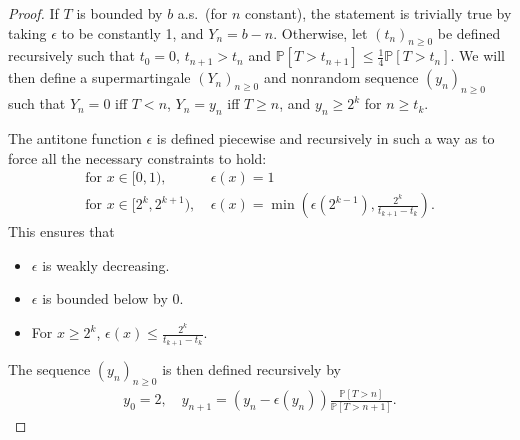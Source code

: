 \antitoneSeemsComplete*

\begin{proof}
If $T$ is bounded by $b$ a.s.~(for $n$ constant), the statement is trivially true by taking $\epsilon$ to be constantly 1, and $Y_n = b - n$.
Otherwise, let $(t_n)_{n \geq 0}$ be defined recursively such that $t_0 = 0$, $t_{n+1} > t_n$ and $\mathbb P[T > t_{n+1}] \leq \frac 1 4 \mathbb P[T > t_n]$.
We will then define a supermartingale $(Y_n)_{n \geq 0}$ and nonrandom sequence $(y_n)_{n \geq 0}$ such that $Y_n = 0$ iff $T < n$, $Y_n = y_n$ iff $T \geq n$, and $y_n \geq 2^k$ for $n \geq t_k$.

The antitone function $\epsilon$ is defined piecewise and recursively in such a way as to force all the necessary constraints to hold:
\begin{align*}
    \text{for }x \in [0,1),\ &\epsilon(x) = 1 \\
    \text{for }x \in [2^k,2^{k+1}),\ &\epsilon(x) = \min \left (\epsilon(2^{k-1}), \frac{2^k}{t_{k+1}-t_k} \right ).
\end{align*}
This ensures that
\begin{itemize}
\item $\epsilon$ is weakly decreasing. 
\item $\epsilon$ is bounded below by 0.
\item For $x \geq 2^k$, $\epsilon(x) \leq \frac{2^k}{t_{k+1}-t_k}$. 
 
\end{itemize}

The sequence $(y_n)_{n \geq 0}$ is then defined recursively by
\begin{align*}
    y_0 = 2, \quad
    y_{n+1} = (y_n - \epsilon(y_n)) \frac{\mathbb P[T > n]}{\mathbb P[T > n+1]}.
\end{align*}


\end{proof}
